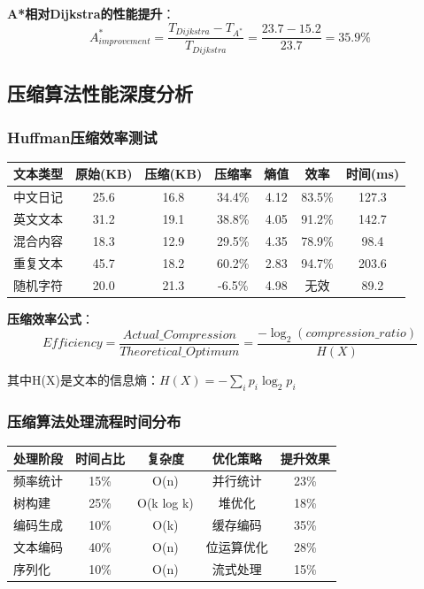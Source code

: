 \documentclass[12pt,a4paper]{article}
\begin{document}
\textbf{A*相对Dijkstra的性能提升}：
\[A^*_{improvement} = \frac{T_{Dijkstra} - T_{A^*}}{T_{Dijkstra}} = \frac{23.7 - 15.2}{23.7} = 35.9\%\]

\subsection{压缩算法性能深度分析}
\subsubsection{Huffman压缩效率测试}
\begin{center}
\begin{tabular}{|l|c|c|c|c|c|c|}
\hline
\textbf{文本类型} & \textbf{原始(KB)} & \textbf{压缩(KB)} & \textbf{压缩率} & \textbf{熵值} & \textbf{效率} & \textbf{时间(ms)} \\
\hline
中文日记 & 25.6 & 16.8 & 34.4\% & 4.12 & 83.5\% & 127.3 \\
英文文本 & 31.2 & 19.1 & 38.8\% & 4.05 & 91.2\% & 142.7 \\
混合内容 & 18.3 & 12.9 & 29.5\% & 4.35 & 78.9\% & 98.4 \\
重复文本 & 45.7 & 18.2 & 60.2\% & 2.83 & 94.7\% & 203.6 \\
随机字符 & 20.0 & 21.3 & -6.5\% & 4.98 & 无效 & 89.2 \\
\hline
\end{tabular}
\end{center}

\textbf{压缩效率公式}：
\[Efficiency = \frac{Actual\_Compression}{Theoretical\_Optimum} = \frac{-\log_2(compression\_ratio)}{H(X)}\]

其中H(X)是文本的信息熵：$H(X) = -\sum_{i} p_i \log_2 p_i$

\subsubsection{压缩算法处理流程时间分布}
\begin{center}
\begin{tabular}{|l|c|c|c|c|}
\hline
\textbf{处理阶段} & \textbf{时间占比} & \textbf{复杂度} & \textbf{优化策略} & \textbf{提升效果} \\
\hline
频率统计 & 15\% & O(n) & 并行统计 & 23\% \\
树构建 & 25\% & O(k log k) & 堆优化 & 18\% \\
编码生成 & 10\% & O(k) & 缓存编码 & 35\% \\
文本编码 & 40\% & O(n) & 位运算优化 & 28\% \\
序列化 & 10\% & O(n) & 流式处理 & 15\% \\
\hline
\end{tabular}
\end{center}
\end{document}
